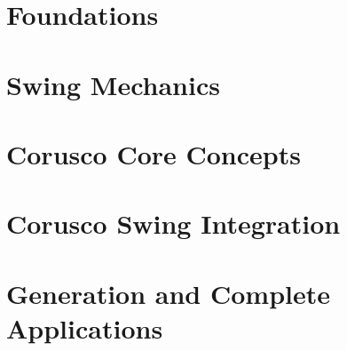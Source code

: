 \documentclass[11pt,a4paper,twoside,openright]{book}
\begin{document}
\frontmatter


\tableofcontents
\mainmatter
\part{Foundations}






\part{Swing Mechanics}














\part{Corusco Core Concepts}






\part{Corusco Swing Integration}






\part{Generation and Complete Applications}




\backmatter


\end{document}
